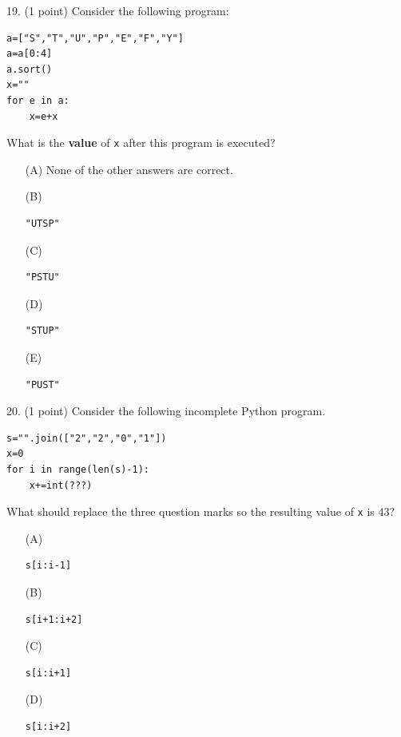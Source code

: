 \documentclass{article}
\newcounter{question}
\begin{document}
\noindent
\begin{minipage}{\textwidth}
19. (1 point)
Consider the following program:
\begin{verbatim}
a=["S","T","U","P","E","F","Y"]
a=a[0:4]
a.sort()
x=""
for e in a:
    x=e+x
\end{verbatim}
What is the \textbf{value} of \texttt{x} after this program is executed?

\begin{enumerate}
\item[(A)]
None of the other answers are correct.

\item[(B)]
\begin{verbatim}"UTSP"\end{verbatim}

\item[(C)]
\begin{verbatim}"PSTU"\end{verbatim}

\item[(D)]
\begin{verbatim}"STUP"\end{verbatim}

\item[(E)]
\begin{verbatim}"PUST"\end{verbatim}

\end{enumerate}
\end{minipage}
\vspace{2em}
\filbreak\vfil{}\vfilneg

\noindent
\begin{minipage}{\textwidth}
20. (1 point)
Consider the following incomplete Python program.
\begin{verbatim}
s="".join(["2","2","0","1"])
x=0
for i in range(len(s)-1):
    x+=int(???)
\end{verbatim}
What should replace the three question marks so the resulting value of \texttt{x} is 43?

\begin{enumerate}
\item[(A)]
\begin{verbatim}s[i:i-1]\end{verbatim}

\item[(B)]
\begin{verbatim}s[i+1:i+2]\end{verbatim}

\item[(C)]
\begin{verbatim}s[i:i+1]\end{verbatim}

\item[(D)]
\begin{verbatim}s[i:i+2]\end{verbatim}

\end{enumerate}
\end{minipage}
\vspace{2em}
\filbreak\vfil{}\vfilneg
\end{document}
